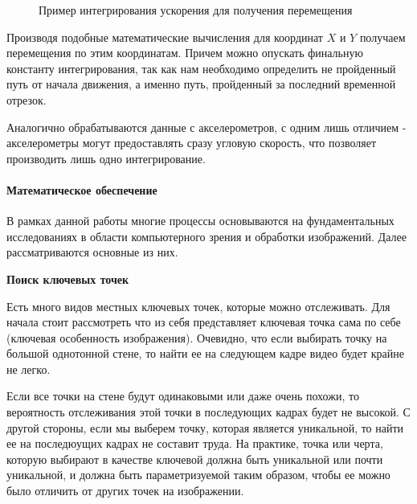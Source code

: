\begin{figure}[!htb]
\caption{Пример интегрирования ускорения для получения перемещения}
\label{pic:integral}
\end{figure}


Производя подобные математические вычисления для координат $X$ и 
$Y$ получаем перемещения по этим координатам. Причем можно опускать финальную константу интегрирования, так как нам необходимо определить не пройденный путь от начала движения, а именно путь, пройденный за последний временной отрезок. 

Аналогично обрабатываются данные с акселерометров, с одним лишь отличием - акселерометры могут предоставлять сразу угловую скорость, что позволяет производить лишь одно интегрирование.


\paragraph{Математическое обеспечение}\label{math}

В рамках данной работы многие процессы основываются на фундаментальных исследованиях в области компьютерного зрения и обработки изображений. Далее рассматриваются основные из них.

\textbf{Поиск ключевых точек}

Есть много видов местных ключевых точек, которые можно отслеживать. Для начала стоит рассмотреть что из себя представляет ключевая точка сама по себе (ключевая особенность изображения). Очевидно, что если выбирать точку на большой однотонной стене, то найти ее на следующем кадре видео будет крайне не легко.

Если все точки на стене будут одинаковыми или даже очень похожи, то вероятность отслеживания этой точки в последующих кадрах будет не высокой. С другой стороны, если мы выберем точку, которая является уникальной, то найти ее на последюущих кадрах не составит труда. На практике, точка или черта, которую выбирают в качестве ключевой должна быть уникальной или почти уникальной, и должна быть параметризуемой таким образом, чтобы ее можно было отличить от других точек на изображении.

